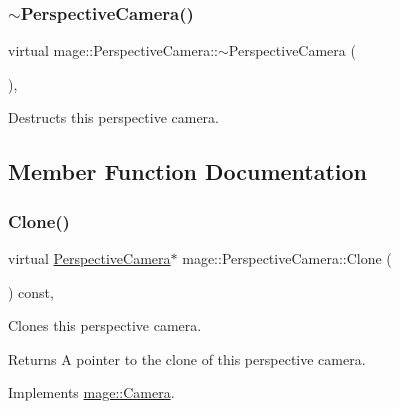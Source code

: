 \subsubsection{\texorpdfstring{$\sim$\+Perspective\+Camera()}{~PerspectiveCamera()}}
{\footnotesize\ttfamily virtual mage\+::\+Perspective\+Camera\+::$\sim$\+Perspective\+Camera (\begin{DoxyParamCaption}{ }\end{DoxyParamCaption})\hspace{0.3cm}{\ttfamily [virtual]}, {\ttfamily [default]}}

Destructs this perspective camera. 

\subsection{Member Function Documentation}
\hypertarget{classmage_1_1_perspective_camera_a08eebf7f3ba10a46b4b23c0ded1192f2}{}\label{classmage_1_1_perspective_camera_a08eebf7f3ba10a46b4b23c0ded1192f2} 
\subsubsection{\texorpdfstring{Clone()}{Clone()}}
{\footnotesize\ttfamily virtual \hyperlink{classmage_1_1_perspective_camera}{Perspective\+Camera}$\ast$ mage\+::\+Perspective\+Camera\+::\+Clone (\begin{DoxyParamCaption}{ }\end{DoxyParamCaption}) const\hspace{0.3cm}{\ttfamily [override]}, {\ttfamily [virtual]}}

Clones this perspective camera.

\begin{DoxyReturn}{Returns}
A pointer to the clone of this perspective camera. 
\end{DoxyReturn}


Implements \hyperlink{classmage_1_1_camera_a19301c2256c183db50b5e9406f7b5f3c}{mage\+::\+Camera}.

\hypertarget{classmage_1_1_perspective_camera_ab74cbd2777d5b430da5702a12b1b451e}{}\label{classmage_1_1_perspective_camera_ab74cbd2777d5b430da5702a12b1b451e} 

